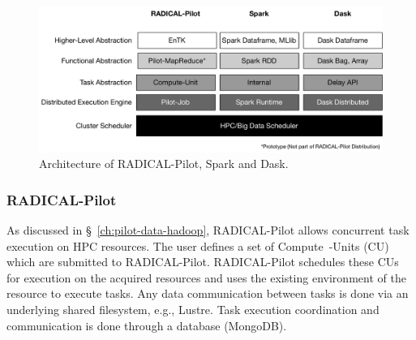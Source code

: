 \begin{figure}[ht]
    \centering
    \includegraphics[width=.95\textwidth]{figures/data_analytics_hpc/task_par/bigdata_framework_stack.pdf}
    \caption{Architecture of RADICAL-Pilot, Spark and Dask.}
    \label{fig:figures_bigdata_framework_stack}
\end{figure}

\subsubsection*{RADICAL-Pilot}

As discussed in \S~\ref{ch:pilot-data-hadoop}, RADICAL-Pilot allows concurrent task execution on HPC resources.
The user defines a set of Compute~-Units (CU) which are submitted to RADICAL-Pilot.
RADICAL-Pilot schedules these CUs for execution on the acquired resources and uses the existing environment of the resource to execute tasks.
Any data communication between tasks is done via an underlying shared filesystem, e.g., Lustre.
Task execution coordination and communication is done through a database (MongoDB).

